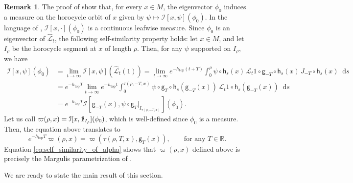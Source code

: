 \documentclass[11pt,letterpaper]{amsart}
\newcommand \cL {{\mathcal L}}
\newcommand \R {{ \mathbb R}}
\newcommand{\horo}{\mathsf{h}}
\newcommand{\geo}{\mathsf{g}}
\newcommand*{\diff}{\mathop{}\!\mathrm{d}}
\newcommand{\one}{{\rm 1\mskip-4mu l}}
\DeclareMathOperator{\topp}{top}
\theoremstyle{definition}
\newtheorem{remark}[theorem]{Remark}
\begin{document}
\begin{remark}\label{rk:leafwise_measure}
The proof of  show that, for every $x \in M$, the eigenvector $\phi_0$ induces a measure on the horocycle orbit of $x$ given by $\psi \mapsto \mathcal{I}[x,\psi](\phi_0)$. In the language of \cite[Sect. 9]{GoLi2}, $\mathcal{I}[x,\cdot](\phi_0)$ is a continuous leafwise measure. Since $\phi_0$ is an eigenvector of ${\hat \cL_t}$, the following self-similarity property holds: let $x \in M$, and let $I_{\rho}$ be the horocycle segment at $x$ of length $\rho$. Then, for any $\psi$ supported on $I_\rho$, we have
\[
\begin{split}
 \mathcal{I}[x,\psi](\phi_0) &=  \lim_{t \to \infty}  \mathcal{I}[x,\psi]({\hat \cL_t}(1)) = \lim_{t \to \infty} e^{-h_{\topp} (t+T)} \int_0^{\rho} \psi\circ \horo_s(x) \, \cL_t1 \circ \geo_{-T}\circ \horo_s(x) \, J_{-T} \circ \horo_s(x) \diff s\\
 &=e^{-h_{\topp} T} \lim_{t \to \infty} e^{-h_{\topp}t} \int_0^{\tau(\rho,-T,x)} \psi \circ \geo_{T}\circ \horo_s(\geo_{-T}(x)) \, \cL_t1 \circ \horo_s(\geo_{-T}(x)) \diff s \\
 &= e^{-h_{\topp} T} \mathcal{I}[\geo_{-T}(x),\psi \circ \geo_{T}|_{I_{\tau(\rho,-T,x)}}](\phi_0).
\end{split}
\]
Let us call $\varpi(\rho,x) = \mathcal{I}[x,\one_{I_{\rho}}](\phi_0) $, which is well-defined since $\phi_0$ is a measure. Then, the equation above translates to 
\begin{equation}\label{eq:self_similarity_of_alpha}
 e^{-h_{\topp} T}\varpi(\rho,x) = \varpi(\tau(\rho,T,x),\geo_{T}(x)), \qquad \text{for any $T\in\R$.}
\end{equation}
Equation \eqref{eq:self_similarity_of_alpha} shows that $\varpi(\rho,x)$ defined above is precisely the Margulis parametrization of .
\end{remark}


 





We are ready to state the main result of this section.
  
\end{document}
